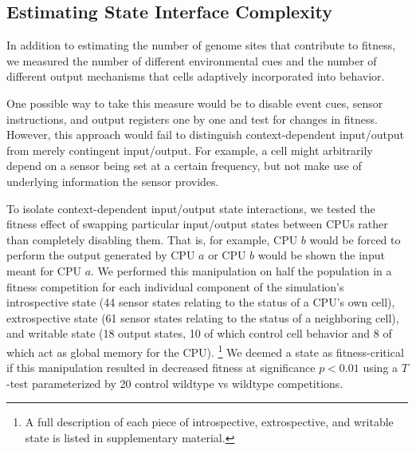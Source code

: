 

\subsection{Estimating State Interface Complexity}
\label{sec:estimating-state-interface-complexity;ch:measuring-cna}

In addition to estimating the number of genome sites that contribute to fitness, we measured the number of different environmental cues and the number of different output mechanisms that cells adaptively incorporated into behavior.

One possible way to take this measure would be to disable event cues, sensor instructions, and output registers one by one and test for changes in fitness.
However, this approach would fail to distinguish context-dependent input/output from merely contingent input/output.
For example, a cell might arbitrarily depend on a sensor being set at a certain frequency, but not make use of underlying information the sensor provides.

To isolate context-dependent input/output state interactions, we tested the fitness effect of swapping particular input/output states between CPUs rather than completely disabling them.
That is, for example, CPU $b$ would be forced to perform the output generated by CPU $a$ or CPU $b$ would be shown the input meant for CPU $a$.
We performed this manipulation on half the population in a fitness competition for each individual component of the simulation's introspective state (44 sensor states relating to the status of a CPU's own cell), extrospective state (61 sensor states relating to the status of a neighboring cell), and writable state (18 output states, 10 of which control cell behavior and 8 of which act as global memory for the CPU).
\footnote{
A full description of each piece of introspective, extrospective, and writable state is listed in supplementary material.
}
We deemed a state as fitness-critical if this manipulation resulted in decreased fitness at significance $p < 0.01$ using a $T$-test parameterized by 20 control wildtype vs wildtype competitions.

